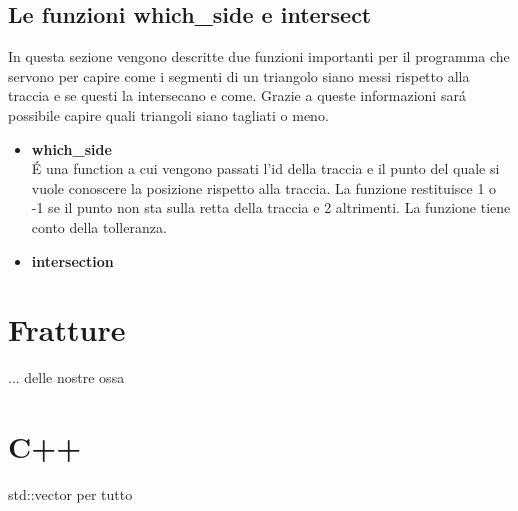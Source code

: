 \documentclass[11pt, a4paper]{article}
\begin{document}
\begin{itemize}
    \subsection{\textbf{Le funzioni which\_side e intersect}}
    In questa sezione vengono descritte due funzioni importanti per il programma che servono per capire come i segmenti di un triangolo siano messi rispetto alla traccia e se questi la intersecano e come. Grazie a queste informazioni sar\'a possibile capire quali triangoli siano tagliati o meno.

    \begin{itemize}
        \item \textbf{which\_side} \\
        \'E una function a cui vengono passati l'id della traccia e il punto del quale si vuole conoscere la posizione rispetto alla traccia. La funzione restituisce 1 o -1 se il punto non sta sulla retta della traccia e 2 altrimenti. La funzione tiene conto della tolleranza.
        \item \textbf{intersection} \\
        




    \end{itemize}





\end{itemize}






\section{Fratture}
... delle nostre ossa


\section{C++}
std::vector per tutto
\end{document}
